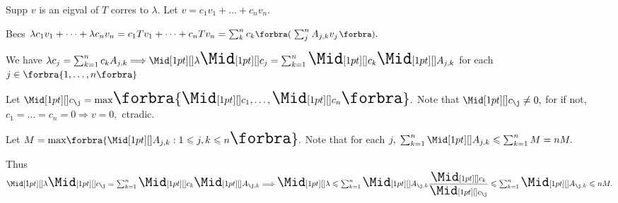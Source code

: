 \par\quad
Supp $v$ is an eigval of $T$ corres to $\lambda.$ Let $v=c_1v_1+\dots+c_nv_n.$\vspace{2pt}\par\quad
Becs $\lambda c_1v_1+\dots+\lambda c_nv_n=c_1Tv_1+\dots+c_nTv_n=\sum_{k}^nc_k\BigPar{\sum_{j}^n A_{j,k}v_j}.$\vspace{3pt}\par\quad
We have $\lambda c_j=\sum_{k=1}^n c_kA_{j,k}\Longrightarrow\aMid{\lambda}\aMid{c_j}=\sum_{k=1}^n\aMid{c_k}\aMid{A_{j,k}}$ for each $j\in\Bra{1,\dots,n}$\vspace{4pt}\par\quad
Let $\aMid{c_{\j}}=\max\!\Bra{\aMid{c_1},\dots,\aMid{c_n}}.$ Note that $\aMid{c_{\j}}\neq 0,$ for if not, $c_1=\dots=c_n=0\Rightarrow v=0,$ ctradic.\vspace{6pt}\par\quad
Let $M=\max\!\Bra{\aMid{A_{j,k}}:1\leqslant j,k\leqslant n}.$ Note that for each $j,\;\sum_{k=1}^n\aMid{A_{j,k}}\leqslant\sum_{k=1}^nM=nM.$\vspace{4pt}\par\quad
Thus $\aMid{\lambda}\aMid{c_{\j}}=\sum_{k=1}^n\aMid{c_k}\aMid{A_{{\j},k}}\Longrightarrow\aMid{\lambda}\leqslant\sum_{k=1}^n\aMid{A_{{\j},k}}\Frac{\aMid{c_k}}{\aMid{c_{\j}}}\leqslant\sum_{k=1}^n\aMid{A_{{\j},k}}\leqslant nM.$\PfEnd\vspace{2pt}
\SepLine\pagebreak

